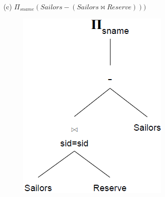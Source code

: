 \documentclass[12pt]{article}
\begin{document}
\pagebreak


\indent \indent (c) {\large $\Pi_{sname}(Sailors - (Sailors \bowtie Reserve)))$} 
\begin{figure}[h!]
  \centering
  \includegraphics[scale=.5]{Q2c.PNG}
\end{figure}
\end{document}
